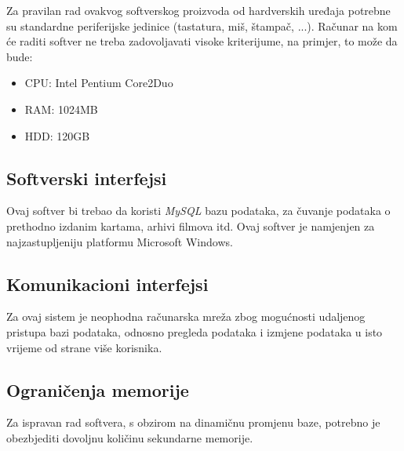 Za pravilan rad ovakvog softverskog proizvoda od hardverskih uređaja potrebne su standardne periferijske jedinice (tastatura, miš, štampač, ...). Računar na kom će raditi softver ne treba zadovoljavati visoke kriterijume, na primjer, to može da bude:
\begin{itemize}
  \item CPU: Intel Pentium Core2Duo 
  \item RAM: 1024MB
  \item HDD: 120GB
\end{itemize}
%
%
%
%
\subsection{Softverski interfejsi}

Ovaj softver bi trebao da koristi \textit{MySQL} bazu podataka, za čuvanje podataka o prethodno izdanim kartama, arhivi filmova itd. Ovaj softver je namjenjen za najzastupljeniju platformu Microsoft Windows.



\subsection{Komunikacioni interfejsi} 

Za ovaj sistem je neophodna računarska mreža zbog mogućnosti udaljenog pristupa bazi podataka, odnosno pregleda podataka i izmjene podataka u isto vrijeme od strane više korisnika.
%
%

\subsection{Ograničenja memorije}

Za ispravan rad softvera, s obzirom na dinamičnu promjenu baze, potrebno je obezbjediti dovoljnu količinu sekundarne memorije. 

